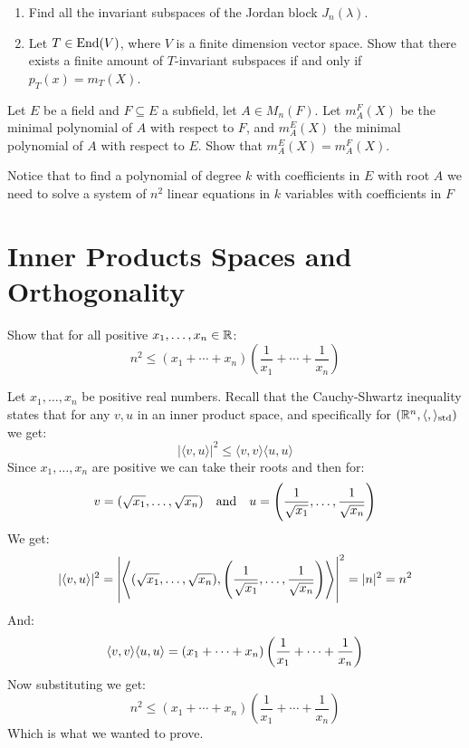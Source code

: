 \documentclass[11pt, a4paper]{article}
\begin{document}
\begin{exercise} \phantom{}
  \begin{enumerate}
    \item[(1)] Find all the invariant subspaces of the Jordan block $J_n(\lambda)$.
    \item[(2)] Let $T \in \operatorname{End}(V)$, where $V$ is a finite dimension vector space.
      Show that there exists a finite amount of $T$-invariant subspaces if and
      only if $p_T(x) = m_T(X)$.
  \end{enumerate}
\end{exercise}

\begin{exercise}
  Let $E$ be a field and $F \subseteq E$ a subfield, let $A \in M_n(F)$.
  Let $m_A^F(X)$ be the minimal polynomial of $A$ with respect to $F$,
  and $m_A^E(X)$ the minimal polynomial of $A$ with respect to $E$.
  Show that $m_A^E(X) = m_A^F(X)$.

  Notice that to find a polynomial of degree $k$ with coefficients in $E$ with
  root $A$ we need to solve a system of $n^2$ linear equations in $k$ variables
  with coefficients in $F$
\end{exercise}

\newpage

\section{Inner Products Spaces and Orthogonality}

\begin{exercise}
  Show that for all positive $x_1,\dots,x_n\in\mathbb{R}$:
  \[
    n^2 \le (x_1+\cdots+x_n)\left(\frac{1}{x_1}+\cdots+\frac{1}{x_n}\right)
  \]
\end{exercise}
\begin{solution}
  Let $x_1,\dots,x_n$ be positive real numbers.
  Recall that the Cauchy-Shwartz inequality states that for any $v,u$ in an 
  inner product space, and specifically for $(\mathbb{R}^n,\langle,\rangle_{\operatorname{std}})$
  we get:
  \[
    \vert\langle v,u\rangle\vert^2 \le \langle v,v\rangle\langle u,u\rangle
  \]
  Since $x_1,\dots,x_n$ are positive we can take their roots and then for:
  \[ 
    v=(\sqrt{x_1},\dots,\sqrt{x_n}) \quad\text{and}\quad 
    u=\del{\frac{1}{\sqrt{x_1}},\dots,\frac{1}{\sqrt{x_n}}}
  \]
  We get:
  \[
    \vert\langle v,u\rangle\vert^2 = 
    \abs{\ip{(\sqrt{x_1},\dots,\sqrt{x_n})}{
    \del{\frac{1}{\sqrt{x_1}},\dots,\frac{1}{\sqrt{x_n}}}}}^2 =
    \vert n\vert^2 = n^2
  \]
  And:
  \[
    \langle v,v\rangle\langle u,u\rangle = 
    (x_1+\cdots+x_n)\del{\frac{1}{x_1}+\cdots+\frac{1}{x_n}}
  \]
  Now substituting we get:
  \[
    n^2 \le (x_1+\cdots+x_n)\left(\frac{1}{x_1}+\cdots+\frac{1}{x_n}\right)
  \]
  Which is what we wanted to prove.
\end{solution}
\end{document}
